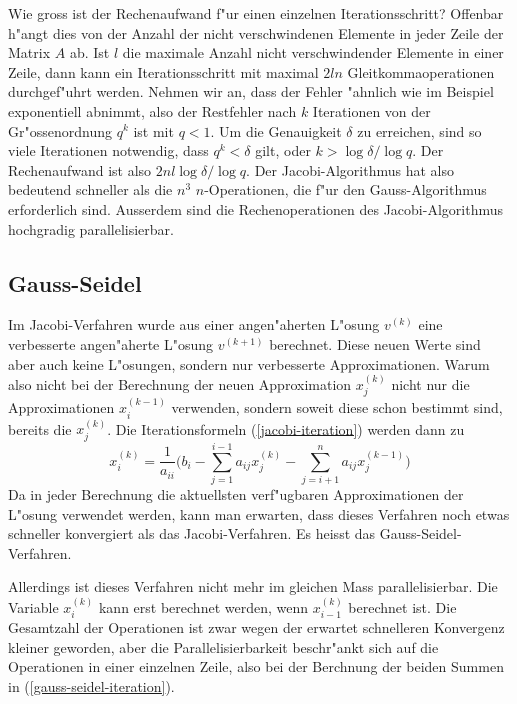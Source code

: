 Wie gross ist der Rechenaufwand f"ur einen einzelnen Iterationsschritt?
Offenbar h"angt dies von der Anzahl der nicht verschwindenen Elemente 
in jeder Zeile der Matrix $A$ ab.
Ist $l$ die maximale Anzahl nicht verschwindender Elemente in einer Zeile,
dann kann ein Iterationsschritt mit maximal $2ln$ Gleitkommaoperationen
durchgef"uhrt werden. Nehmen wir an, dass der Fehler "ahnlich wie im Beispiel
exponentiell abnimmt, also der Restfehler nach $k$ Iterationen von der
Gr"ossenordnung $q^k$ ist mit $q<1$.
Um die Genauigkeit $\delta$ zu erreichen, sind so viele Iterationen notwendig,
dass $q^k < \delta$ gilt, oder $k>\log \delta/\log q$.
Der Rechenaufwand ist also $2nl\log\delta/\log q$.
Der Jacobi-Algorithmus hat also bedeutend schneller als die $n^3$ 
$n$-Operationen, die f"ur den Gauss-Algorithmus erforderlich sind.
Ausserdem sind die Rechenoperationen des Jacobi-Algorithmus hochgradig
parallelisierbar.

\subsection{Gauss-Seidel}
Im Jacobi-Verfahren wurde aus einer angen"aherten L"osung $v^{(k)}$
eine verbesserte angen"aherte L"osung $v^{(k+1)}$ berechnet.
Diese neuen Werte sind aber auch keine L"osungen, sondern nur verbesserte
Approximationen.
Warum also nicht bei der Berechnung der neuen Approximation $x_j^{(k)}$
nicht nur die Approximationen $x_i^{(k-1)}$ verwenden, sondern soweit
diese schon bestimmt sind, bereits die $x_j^{(k)}$.
Die Iterationsformeln (\ref{jacobi-iteration}) werden dann zu
\begin{equation}
x_i^{(k)}=\frac1{a_{ii}}\biggl(b_i
-\sum_{j=1}^{i-1}a_{ij}x_j^{(k)}
-\sum_{j=i+1}^na_{ij}x_j^{(k-1)}
\biggr)
\label{gauss-seidel-iteration}
\end{equation}
Da in jeder Berechnung die aktuellsten verf"ugbaren Approximationen der
L"osung verwendet werden, kann man erwarten, dass dieses Verfahren
noch etwas schneller konvergiert als das Jacobi-Verfahren.
Es heisst das Gauss-Seidel-Verfahren.

Allerdings ist dieses Verfahren nicht mehr im gleichen Mass parallelisierbar.
Die Variable $x_i^{(k)}$ kann erst berechnet werden, wenn $x_{i-1}^{(k)}$
berechnet ist. Die Gesamtzahl der Operationen ist zwar wegen der erwartet
schnelleren Konvergenz kleiner geworden, aber die Parallelisierbarkeit
beschr"ankt sich auf die Operationen in einer einzelnen Zeile, also
bei der Berchnung der beiden Summen in (\ref{gauss-seidel-iteration}).

